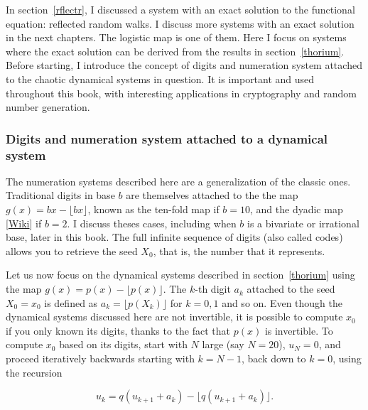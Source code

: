 \documentclass[oneside,10pt]{book}
\begin{document}
In section~\ref{rflectr}, I discussed a system with an exact solution to the functional equation: reflected random walks. I discuss more systems with an exact  solution in the next chapters. The logistic map is one of them. Here I focus on systems where the exact solution can be derived from the results in section~\ref{thorium}. Before starting, I introduce the concept of digits and numeration system attached to the 
chaotic dynamical systems in question. It is important and used throughout this book, with interesting applications in cryptography and random number generation.

\subsubsection{Digits and numeration system attached to a dynamical system}\label{digits}

The \textcolor{index}{numeration systems} described here are a generalization of the classic ones. Traditional \textcolor{index}{digits} in base $b$
are themselves attached to the 
the map $g(x)= bx - \lfloor bx \rfloor$, known as the \textcolor{index}{ten-fold map} if $b=10$, and the \textcolor{index}{dyadic map} [\href{https://en.wikipedia.org/wiki/Dyadic_transformation}{Wiki}] if  $b=2$. 
I discuss theses cases, including when $b$ is a bivariate or \textcolor{index}{irrational base}, later in this book. The full
 infinite sequence of digits (also called \textcolor{index}{codes}) allows you to retrieve the seed $X_0$, that is, the number that it represents.

Let us now focus on the dynamical systems described in section~\ref{thorium} using the map $g(x) = p(x) - \lfloor p(x) \rfloor$.
The $k$-th digit $a_k$ attached to the seed $X_0=x_0$ is defined as $a_k=\lfloor p(X_k)\rfloor$ for $k=0,1$ and so on. Even though the dynamical systems discussed here are not invertible, it is possible to compute $x_0$ if you only known its digits, thanks to the fact that $p(x)$ is invertible. To compute $x_0$ based on its digits, start with $N$ large (say $N=20$), $u_N=0$, and proceed iteratively backwards starting with $k=N-1$, back down to $k=0$, using the recursion 

$$u_k=q(u_{k+1} + a_k)-\lfloor q(u_{k+1} + a_k)\rfloor.$$
\end{document}

